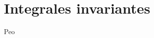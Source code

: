 \documentclass[../main.tex]{subfiles}
\begin{document}
\section{Integrales invariantes}
Peo
\end{document}
